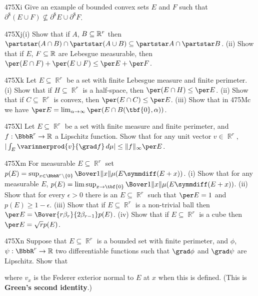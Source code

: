 {\spheader 475Xi Give an example of bounded convex sets $E$ and $F$ such
that
$\partial^{\$}(E\cup F)\not\subseteq\partial^{\$}E\cup\partial^{\$}F$.

\spheader 475Xj(i) Show that if $A$, $B\subseteq\Bbb R^r$ then
$\partstar(A\cap B)\cap\partstar(A\cup B)
\subseteq\partstar A\cap\partstar B$.    (ii) Show that if $E$,
$F\subseteq\Bbb R$ are Lebesgue measurable, then
$\per(E\cap F)+\per(E\cup F)\le\per E+\per F$.

\sqheader 475Xk Let $E\subseteq\BbbR^r$ be a set with finite Lebesgue
measure and finite perimeter.   (i) Show that if $H\subseteq\BbbR^r$ is
a half-space, then $\per(E\cap H)\le\per E$.      (ii) Show
that if $C\subseteq\BbbR^r$ is convex, then $\per(E\cap C)\le\per E$.
   (iii) Show that in 475Mc we have
$\per E=\lim_{\alpha\to\infty}\per(E\cap B(\tbf{0},\alpha))$.

\spheader 475Xl
Let $E\subseteq\BbbR^r$ be a set with finite measure and finite
perimeter, and
$f:\BbbR^r\to\Bbb R$ a Lipschitz function.   Show that for any unit vector
$v\in\BbbR^r$,
$|\int_E\varinnerprod{v}{\grad f}\,d\mu|\le\|f\|_{\infty}\per E$.

\spheader 475Xm For measurable $E\subseteq\BbbR^r$ set
$p(E)
=\sup_{x\in\BbbR^r\setminus\{0\}}\Bover1{\|x\|}\mu(E\symmdiff(E+x))$.
(i) Show that for any measurable $E$,
$p(E)=\limsup_{x\to\tbf{0}}\Bover1{\|x\|}\mu(E\symmdiff(E+x))$.
(ii) Show that for every $\epsilon>0$ there is an
$E\subseteq\BbbR^r$ such that $\per E=1$ and $p(E)\ge 1-\epsilon$.
(iii) Show that if $E\subseteq\BbbR^r$ is a non-trivial
ball then $\per E=\Bover{r\beta_r}{2\beta_{r-1}}p(E)$.
(iv) Show that if $E\subseteq\BbbR^r$ is a cube then
$\per E=\sqrt{r}p(E)$.   

\spheader 475Xn Suppose that $E\subseteq\BbbR^r$ is a bounded
set with finite perimeter, and $\phi$, $\psi:\BbbR^r\to\Bbb R$ two
differentiable functions such that $\grad\phi$ and $\grad\psi$ are
Lipschitz.   Show that


\noindent where $v_x$ is the Federer exterior normal to $E$ at $x$ when
this is defined.   (This is {\bf Green's second identity}.)

}
